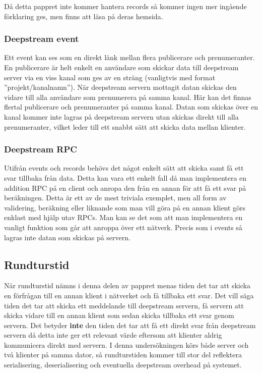Då detta pappret inte kommer hantera records så kommer ingen mer ingående förklaring ges, men finns att läsa på deras hemsida\cite{ds-storingdata}.

\subsubsection{Deepstream event}
Ett event\cite{ds:event} kan ses som en direkt länk mellan flera publicerare och prenumeranter. En publicerare är helt enkelt en användare som skickar data till deepstream server via en viss kanal som ges av en sträng (vanligtvis med format ''projekt/kanalnamn''). När deepstream servern mottagit datan skickas den vidare till alla användare som prenumerera på samma kanal. Här kan det finnas flertal publicerare och prenumeranter på samma kanal. Datan som skickas över en kanal kommer inte lagras på deepstream servern utan skickas direkt till alla prenumeranter, vilket leder till ett snabbt sätt att skicka data mellan klienter.

\subsubsection{Deepstream RPC}
Utifrån events och records behövs det något enkelt sätt att skicka samt få ett svar tillbaka från data. Detta kan vara ett enkelt fall då man implementera en addition RPC\cite{ds:rpc} på en client och anropa den från en annan för att få ett svar på beräkningen. Detta är ett av de mest triviala exemplet, men all form av validering, beräkning eller liknande som man vill göra på en annan klient görs enklast med hjälp utav RPCs. Man kan se det som att man implementera en vanligt funktion som går att anroppa över ett nätverk. Precis som i events så lagras inte datan som skickas på servern.

\subsection{Rundturstid}
När rundturstid nämns i denna delen av pappret menas tiden det tar att skicka en förfrågan till en annan klient i nätverket och få tillbaka ett svar. Det vill säga tiden det tar att skicka ett meddelande till deepstream servern, få servern att skicka vidare till en annan klient som sedan skicka tillbaka ett svar genom servern. Det betyder \textbf{inte} den tiden det tar att få ett direkt svar från deepstream servern då detta inte ger ett relevant värde eftersom att klienter aldrig kommunicera direkt med servern. I denna undersökningen körs både server och två klienter på samma dator, så rundturstiden kommer till stor del reflektera serialisering, deserialisering och eventuella deepstream overhead på systemet.

